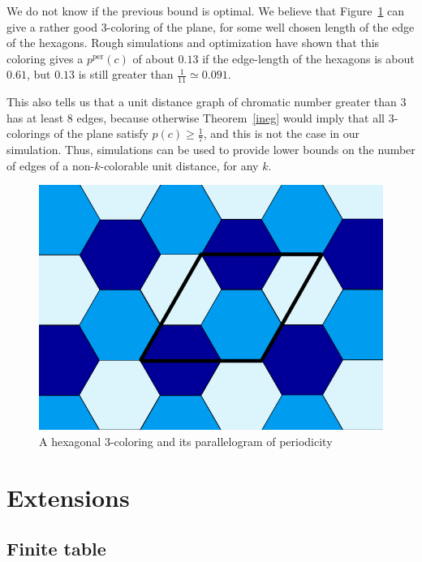 \documentclass[a4paper,11pt]{article}
\theoremstyle{definition}
\theoremstyle{remark}
\newcommand{\pper}{p^{\mathrm{per}}}
\begin{document}
We do not know if the previous bound is optimal. We believe that Figure~\ref{trois} 
can give a rather good $3$-coloring of the plane, for some well chosen length 
of the edge of the hexagons. Rough simulations and optimization have shown that 
this coloring gives a $\pper(c)$ of about $0.13$ if the edge-length of the hexagons is about 
$0.61$, but $0.13$ is still greater than $\frac{1}{11} \simeq 0.091$.

This also tells us that a unit distance graph of chromatic number greater than 3
has at least $8$ edges, because otherwise Theorem~\ref{ineg} would imply that
all $3$-colorings of the plane satisfy $p(c) \geq \frac17$, and this is not the
case in our simulation. Thus, simulations can be used to provide lower bounds on the
number of edges of a non-$k$-colorable unit distance, for any $k$.

\begin{figure}[h]
\center
\includegraphics[scale=0.5]{trois.png}
\caption{\label{trois} A hexagonal $3$-coloring and its parallelogram of periodicity}
\end{figure}

\section{Extensions}
\label{ext}
\subsection{Finite table}
\label{fini}
\end{document}
